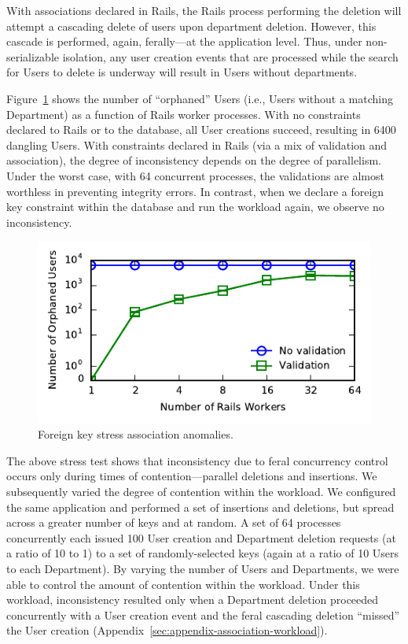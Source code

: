 With associations declared in Rails, the Rails process performing the
deletion will attempt a cascading delete of users upon department
deletion. However, this cascade is performed, again, ferally---at the
application level. Thus, under non-serializable isolation, any user creation
events that are processed while the search for Users to delete is
underway will result in Users without departments.

Figure~\ref{fig:fk-stress} shows the number of ``orphaned'' Users
(i.e., Users without a matching Department) as a function of Rails
worker processes. With no constraints declared to Rails or to the
database, all User creations succeed, resulting in 6400 dangling
Users. With constraints declared in Rails (via a mix of validation and
association), the degree of inconsistency depends on the degree of
parallelism. Under the worst case, with 64 concurrent processes, the
validations are almost worthless in preventing integrity errors. In
contrast, when we declare a foreign key constraint within the database
and run the workload again, we observe no inconsistency.

\begin{figure}
\includegraphics[width=\columnwidth]{figs/fk-stress-violations.pdf}\vspace{-1em}
\caption{Foreign key stress association anomalies.}
\label{fig:fk-stress}
\end{figure}

The above stress test shows that inconsistency due to feral
concurrency control occurs only during times of contention---parallel
deletions and insertions. We subsequently varied the degree of
contention within the workload. We configured the same application and
performed a set of insertions and deletions, but spread across a
greater number of keys and at random. A set of 64 processes
concurrently each issued 100 User creation and Department deletion
requests (at a ratio of 10 to 1) to a set of randomly-selected keys
(again at a ratio of 10 Users to each Department). By varying the
number of Users and Departments, we were able to control the amount of
contention within the workload. Under this workload, inconsistency
resulted only when a Department deletion proceeded concurrently with a
User creation event and the feral cascading deletion ``missed'' the
User creation (Appendix~\ref{sec:appendix-association-workload}).

